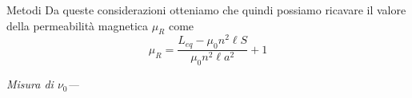 \documentclass[
    rmp,
    reprint, 
    superscriptaddress, 
    altaffilletter, 
    amsmath, 
    amssymb, 
    a4paper]{revtex4-2}
\begin{document}
\begin{methods}{Metodi}
    Da queste considerazioni otteniamo che quindi possiamo ricavare il valore della permeabilità magnetica $\mu_R$ come \begin{equation}\mu_R=\frac{L_{eq}-\mu_0 n^2 \ell S}{\mu_0 n^2\ell a^2} + 1\end{equation}

    \noindent\textit{Misura di $\nu_0$---}
    
\end{methods}


\appendix

\setcounter{table}{0}
\renewcommand{\thetable}{S-\arabic{table}}

\end{document}
